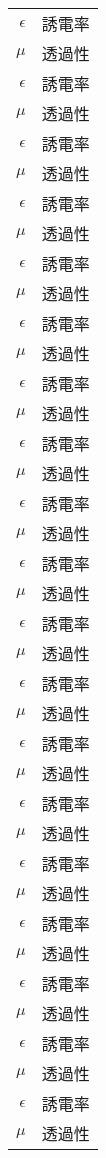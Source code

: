 \begin{nomenclature}

\begin{longtable}{rl}
  $\epsilon$ & 誘電率 \\
  $\mu$      & 透過性 \\
  $\epsilon$ & 誘電率 \\
  $\mu$      & 透過性 \\
  $\epsilon$ & 誘電率 \\
  $\mu$      & 透過性 \\
  $\epsilon$ & 誘電率 \\
  $\mu$      & 透過性 \\
  $\epsilon$ & 誘電率 \\
  $\mu$      & 透過性 \\
  $\epsilon$ & 誘電率 \\
  $\mu$      & 透過性 \\
  $\epsilon$ & 誘電率 \\
  $\mu$      & 透過性 \\
  $\epsilon$ & 誘電率 \\
  $\mu$      & 透過性 \\
  $\epsilon$ & 誘電率 \\
  $\mu$      & 透過性 \\
  $\epsilon$ & 誘電率 \\
  $\mu$      & 透過性 \\
  $\epsilon$ & 誘電率 \\
  $\mu$      & 透過性 \\
  $\epsilon$ & 誘電率 \\
  $\mu$      & 透過性 \\
  $\epsilon$ & 誘電率 \\
  $\mu$      & 透過性 \\
  $\epsilon$ & 誘電率 \\
  $\mu$      & 透過性 \\
  $\epsilon$ & 誘電率 \\
  $\mu$      & 透過性 \\
  $\epsilon$ & 誘電率 \\
  $\mu$      & 透過性 \\
  $\epsilon$ & 誘電率 \\
  $\mu$      & 透過性 \\
  $\epsilon$ & 誘電率 \\
  $\mu$      & 透過性 \\
  $\epsilon$ & 誘電率 \\
  $\mu$      & 透過性 \\

\end{longtable}
\end{nomenclature}

